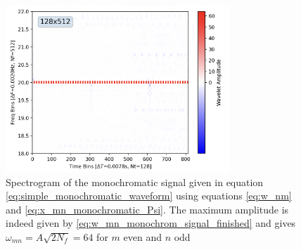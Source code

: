 \documentclass{article}
\begin{document}
\begin{figure}
\centering
\includegraphics[width = 0.75\textwidth]{figures/Monochromatic_Signal/Spectrogram.png}
\caption{Spectrogram of the monochromatic signal given in equation \eqref{eq:simple_monochromatic_waveform} using equations \eqref{eq:w_nm} and \eqref{eq:x_mn_monochromatic_Psi}. The maximum amplitude is indeed given by \eqref{eq:w_mn_monochrom_signal_finished} and gives $\omega_{mn} = A\sqrt{2N_{f}} = 64$ for $m$ even and $n$ odd}
\label{fig:hello}
\end{figure}
\end{document}
